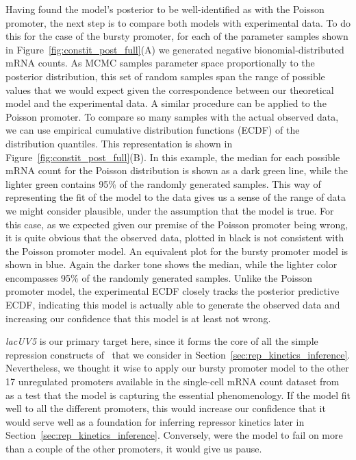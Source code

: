 Having found the model's posterior to be well-identified as with the Poisson
promoter, the next step is to compare both models with experimental data. To do
this for the case of the bursty promoter, for each of the parameter samples
shown in Figure~\ref{fig:constit_post_full}(A) we generated negative
bionomial-distributed mRNA counts. As MCMC samples parameter space
proportionally to the posterior distribution, this set of random samples span
the range of possible values that we would expect given the correspondence
between our theoretical model and the experimental data. A similar procedure can
be applied to the Poisson promoter. To compare so many samples with the actual
observed data, we can use empirical cumulative distribution functions (ECDF) of
the distribution quantiles. This representation is shown in
Figure~\ref{fig:constit_post_full}(B). In this example, the median for each
possible mRNA count for the Poisson distribution is shown as a dark green line,
while the lighter green contains 95\% of the randomly generated samples. This
way of representing the fit of the model to the data gives us a sense of the
range of data we might consider plausible, under the assumption that the model
is true. For this case, as we expected given our premise of the Poisson promoter
being wrong, it is quite obvious that the observed data, plotted in black is not consistent with
the Poisson promoter model. An 
equivalent plot for the bursty promoter model is shown in blue. Again the darker
tone shows the median, while the lighter color encompasses 95\% of the randomly
generated samples. Unlike the Poisson promoter model, the experimental ECDF
closely tracks the posterior predictive ECDF, indicating this model is actually
able to generate the observed data and increasing our confidence that this model
is at least not wrong.

\textit{lacUV5} is our primary target here, since it forms the core of all the
simple repression constructs of~\cite{Jones2014} that we consider in
Section~\ref{sec:rep_kinetics_inference}. Nevertheless, we thought it wise to
apply our bursty promoter model to the other 17 unregulated promoters available
in the single-cell mRNA count dataset from~\cite{Jones2014} as a test that the
model is capturing the essential phenomenology. If the model fit well to all the
different promoters, this would increase our confidence that it would serve well
as a foundation for inferring repressor kinetics later in
Section~\ref{sec:rep_kinetics_inference}. Conversely, were the model to fail on
more than a couple of the other promoters, it would give us pause.

